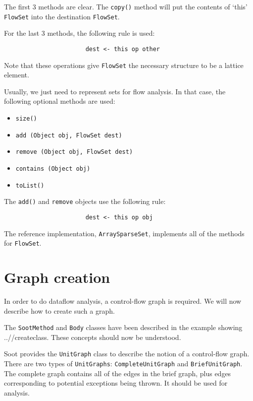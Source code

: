 \documentclass{article}
\begin{document}
The first 3 methods are clear.  The {\tt copy()} method
will put the contents of `this' {\tt FlowSet} into the
destination {\tt FlowSet}.  

For the last 3 methods, the following rule is used:

\begin{verbatim}
                       dest <- this op other
\end{verbatim}

Note that these operations give {\tt FlowSet} the necessary
structure to be a lattice element.  

Usually, we just need to represent sets for flow analysis.  In that
case, the following optional methods are used:
\begin{itemize}
\item {\tt size()}
\item {\tt add (Object obj, FlowSet dest)}
\item {\tt remove (Object obj, FlowSet dest)}
\item {\tt contains (Object obj)}
\item {\tt toList()}
\end{itemize}

The {\tt add()} and {\tt remove} objects use the following rule:

\begin{verbatim}
                       dest <- this op obj
\end{verbatim}

The reference implementation, {\tt ArraySparseSet}, implements all
of the methods for {\tt FlowSet}.

\section{Graph creation}

In order to do dataflow analysis, a control-flow graph is required.
We will now describe how to create such a graph.

The {\tt SootMethod} and {\tt Body} classes have been described in the
example showing 
{..//createclass}.
These concepts should now be understood.  

Soot provides the {\tt UnitGraph} class to describe the notion of
a control-flow graph.  There are two types of {\tt UnitGraphs}:
{\tt CompleteUnitGraph} and {\tt BriefUnitGraph}.  The complete graph
contains all of the edges in the brief graph, plus edges corresponding
to potential exceptions being thrown.  It should be used for analysis.
\end{document}
